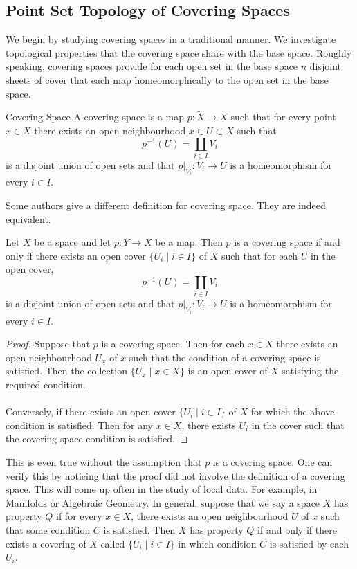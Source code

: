 \documentclass[a4paper]{article}
\begin{document}
\subsection{Point Set Topology of Covering Spaces}
We begin by studying covering spaces in a traditional manner. We investigate topological properties that the covering space share with the base space. Roughly speaking, covering spaces provide for each open set in the base space $n$ disjoint sheets of cover that each map homeomorphically to the open set in the base space. 

\begin{defn}{Covering Space}{} A covering space is a map $p:\tilde{X}\to X$ such that for every point $x\in X$ there exists an open neighbourhood $x\in U\subset X$ such that $$p^{-1}(U)=\coprod_{i\in I}V_i$$ is a disjoint union of open sets and that $p|_{V_i}:V_i\to U$ is a homeomorphism for every $i\in I$. 
\end{defn}

Some authors give a different definition for covering space. They are indeed equivalent. 

\begin{prp}{}{} Let $X$ be a space and let $p:Y\to X$ be a map. Then $p$ is a covering space if and only if there exists an open cover $\{U_i\;|\;i\in I\}$ of $X$ such that for each $U$ in the open cover, $$p^{-1}(U)=\coprod_{i\in I}V_i$$ is a disjoint union of open sets and that $p|_{V_i}:V_i\to U$ is a homeomorphism for every $i\in I$. \tcbline
\begin{proof}
Suppose that $p$ is a covering space. Then for each $x\in X$ there exists an open neighbourhood $U_x$ of $x$ such that the condition of a covering space is satisfied. Then the collection $\{U_x\;|\;x\in X\}$ is an open cover of $X$ satisfying the required condition. \\~\\

Conversely, if there exists an open cover $\{U_i\;|\;i\in I\}$ of $X$ for which the above condition is satisfied. Then for any $x\in X$, there exists $U_i$ in the cover such that the covering space condition is satisfied. 
\end{proof}
\end{prp}

This is even true without the assumption that $p$ is a covering space. One can verify this by noticing that the proof did not involve the definition of a covering space. This will come up often in the study of local data. For example, in Manifolds or Algebraic Geometry. In general, suppose that we say a space $X$ has property $Q$ if for every $x\in X$, there exists an open neighbourhood $U$ of $x$ such that some condition $C$ is satisfied. Then $X$ has property $Q$ if and only if there exists a covering of $X$ called $\{U_i\;|\;i\in I\}$ in which condition $C$ is satisfied by each $U_i$. \\~\\
\end{document}
